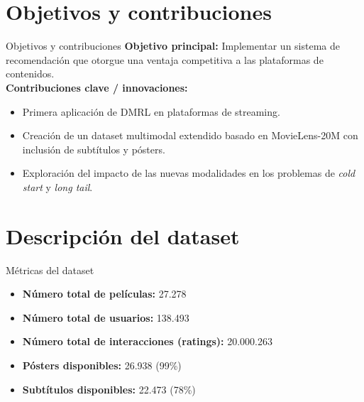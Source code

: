 \documentclass{beamer}
\begin{document}
\section{Objetivos y contribuciones}
\begin{frame}{Objetivos y contribuciones}
    \textbf{Objetivo principal:} Implementar un sistema de recomendación que otorgue una ventaja competitiva a las plataformas de contenidos. \\
    \vspace{0.5cm}
    \textbf{Contribuciones clave / innovaciones:}
    \begin{itemize}
        \item Primera aplicación de DMRL en plataformas de streaming.
        \item Creación de un dataset multimodal extendido basado en MovieLens-20M con inclusión de subtítulos y pósters.
        \item Exploración del impacto de las nuevas modalidades en los problemas de \textit{cold start} y \textit{long tail}.
    \end{itemize}
\end{frame}

\section{Descripción del dataset}

\begin{frame}{Métricas del dataset}
    \begin{itemize}
        \item \textbf{Número total de películas:} 27.278
        \item \textbf{Número total de usuarios:} 138.493
        \item \textbf{Número total de interacciones (ratings):} 20.000.263
        \item \textbf{Pósters disponibles:} 26.938 (99\%)
        \item \textbf{Subtítulos disponibles:} 22.473 (78\%)
    \end{itemize}
\end{frame}
\end{document}
